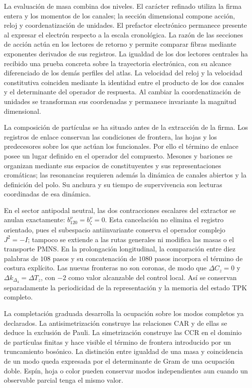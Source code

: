 La evaluación de masa combina dos niveles. El carácter refinado utiliza
la firma entera y los momentos de los canales; la sección dimensional
compone acción, reloj y coordenatización de unidades. El prefactor electrónico
permanece presente al expresar el electrón respecto a la escala
cronológica. La razón de las secciones de acción actúa en los lectores
de retorno y permite comparar fibras mediante exponentes derivados de
sus registros. La igualdad de los dos lectores centrales ha recibido
una prueba concreta sobre la trayectoria electrónica, con su alcance
diferenciado de los demás perfiles del atlas.
La velocidad del reloj y la velocidad constitutiva coinciden mediante
la identidad entre el producto de los dos canales y el determinante del
operador de respuesta. Al cambiar la coordenatización de unidades se transforman
sus coordenadas y permanece invariante la magnitud dimensional.

La composición de partículas se ha situado antes de la extracción de
la firma. Los registros de enlace conservan las condiciones de frontera,
las hojas y los predecesores sobre los que actúan los funcionales. Por
ello el término de enlace posee un lugar definido en el operador del
compuesto. Mesones y bariones se organizan mediante sus espacios de
constituyentes y sus representaciones cromáticas; las resonancias
requieren además la dinámica de canales abiertos y la definición del
polo. Su anchura y su tiempo de supervivencia son lecturas coordinadas
de esa dinámica.

En el sector antipodal neutral, las dos contracciones escalares del
extractor se anulan exactamente:
\(b_{120}^{\nu}=b_{\zeta}^{\nu}=0\). Esta cancelación no elimina el
registro orientado, pues el subespacio antiinvariante conserva el operador
complejo \(J^2=-I\); tampoco se extiende a las rutas generales ni modifica
las masas o el transporte PMNS. En la prolongación longitudinal, la
comparación entre diez palabras de \(108\) pasos y su concatenación de
\(1080\) pasos incorpora el término de costura explícito. Las nuevas
fronteras no son coronas, de modo que
\(\Delta C_z=0\) y \(\Delta k_{\Delta_4}=\Delta T_z\), con \(-2\) como
valor alcanzable del control local. Así se conservan separadamente la
periodicidad de la representación y la memoria del estado TPK completo.

La completación graduada desarrolla la ocupación sobre los modos
completos ya declarados. La antisimetrización construye las relaciones
CAR y de ellas se deduce la exclusión de Pauli. La simetrización
construye las CCR en el dominio de partículas finitas y hace visible
el término de frontera introducido por un truncamiento bosónico.
La distinción entre igualdad de una masa y coincidencia de un modo
queda expresada por el determinante de Gram de una ocupación doble.
Espín, hoja o color pueden conservar modos independientes aun cuando
un observable parcial tenga el mismo valor.

